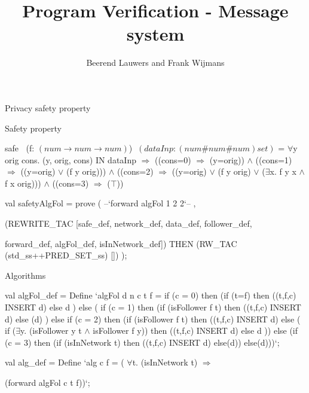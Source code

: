 \documentclass[10pt,a4paper]{beamer}
\author{Beerend Lauwers and Frank Wijmans}
\title{Program Verification - Message system}
\begin{document}
	
	\maketitle
	
	\begin{frame}{Privacy safety property}
		
		Safety property
		
		
		safe \newline
		$ \> $ (f: $(num \rightarrow num \rightarrow num)$)
		$ \> (dataInp:(num\#num\#num) set)$ = \newline
		$ \forall $y  orig  cons.  (y, orig, cons) IN dataInp $ \Rightarrow $ \newline
		((cons=0)  $ \Rightarrow $ (y=orig)) $ \wedge $ \newline
		((cons=1)  $ \Rightarrow $ ((y=orig) $ \vee $ (f y orig))) $ \wedge $ \newline
		((cons=2)  $ \Rightarrow $ ((y=orig) $ \vee $ (f y orig) $ \vee $ ($ \exists $x. f y x $ \wedge $ f x orig))) $ \wedge $ \newline
		((cons=3)  $ \Rightarrow $ ($\top$)) \newline		
		
		
		val safetyAlgFol = prove (
		--`forward algFol 1 2 2`-- ,
		
		(REWRITE\_TAC [safe\_def, network\_def, data\_def, follower\_def, 
		
		forward\_def, algFol\_def, isInNetwork\_def])
		THEN (RW\_TAC (std\_ss++PRED\_SET\_ss) [])
		);
		
	\end{frame}

	\begin{frame}{Algorithms}
		
		val algFol\_def = Define `algFol d n c t f =
		if (c = 0)
		then (if (t=f)
		then ((t,f,c) INSERT d)
		else d )
		else (
		if (c = 1) 
		then (if (isFollower f t)
		then ((t,f,c) INSERT d)
		else (d)
		)
		else
		if (c = 2) 
		then (if (isFollower f t)
		then ((t,f,c) INSERT d)
		else (
		if ($\exists$y. (isFollower y t $\wedge$ isFollower f y)) 
		then ((t,f,c) INSERT d)
		else d
		))
		else (if (c = 3)
		then (if (isInNetwork t)
		then ((t,f,c) INSERT d)
		else(d))
		else(d)))`;
		
		
		val alg\_def = Define `alg c f = ( $\forall$t. (isInNetwork t) $\Rightarrow$

		(forward algFol c t f))`;
		
		
	\end{frame}


	
\end{document}
